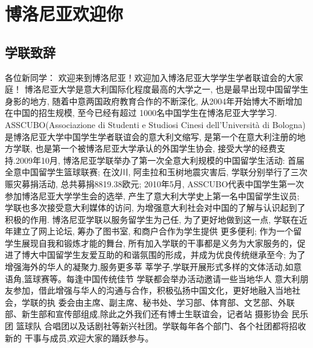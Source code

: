 
% 


\chapter{博洛尼亚欢迎你}                 %

\section{学联致辞}

各位新同学：
             欢迎来到博洛尼亚！欢迎加入博洛尼亚大学学生学者联谊会的大家庭！
          博洛尼亚大学是意大利国际化程度最高的大学之一, 也是最早出现中国留学生身影的地方, 随着中意两国政府教育合作的不断深化, 从2004年开始博大不断增加在中国的招生规模, 至今已经有超过 1000名中国学生在博洛尼亚大学学习.
          ASSCUBO(Associazione di Studenti e Studiosi Cinesi dell’Università di Bologna)是博洛尼亚大学中国学生学者联谊会的意大利文缩写, 是第一个在意大利注册的地方学联, 也是第一个被博洛尼亚大学承认的外国学生协会, 接受大学的经费支持.2009年10月, 博洛尼亚学联举办了第一次全意大利规模的中国留学生活动: 首届全意中国留学生篮球联赛; 在汶川, 阿圭拉和玉树地震灾害后, 学联分别举行了三次赈灾募捐活动, 总共募捐8819.38欧元;  2010年5月, ASSCUBO代表中国学生第一次参加博洛尼亚大学学生会的选举, 产生了意大利大学史上第一名中国留学生议员; 学联也多次接受意大利媒体的访问, 为增强意大利社会对中国的了解与认识起到了积极的作用.
          博洛尼亚学联以服务留学生为己任, 为了更好地做到这一点, 学联在近年建立了网上论坛, 筹办了图书室, 和商户合作为学生提供 更多便利; 作为一个留学生展现自我和锻炼才能的舞台, 所有加入学联的干事都是义务为大家服务的，促进了博大中国留学生友爱互助的和谐氛围的形成，并成为优良传统继承至今; 为了增强海外的华人的凝聚力,服务更多莘 莘学子,学联开展形式多样的文体活动,如意语角,篮球赛等。每逢中国传统佳节 学联都会举办活动邀请一些当地华人 意大利朋友参加，借此增强与华人的沟通与合作，积极弘扬中国文化，更好地融入当地社会，学联的执 委会由主席、副主席、秘书处、学习部、体育部、文艺部、外联部、新生部和宣传部组成,除此之外我们还有博士生联谊会，记者站 摄影协会 民乐团 篮球队 合唱团以及话剧社等新兴社团。学联每年各个部门、各个社团都将招收新的 干事与成员,欢迎大家的踊跃参与。 




